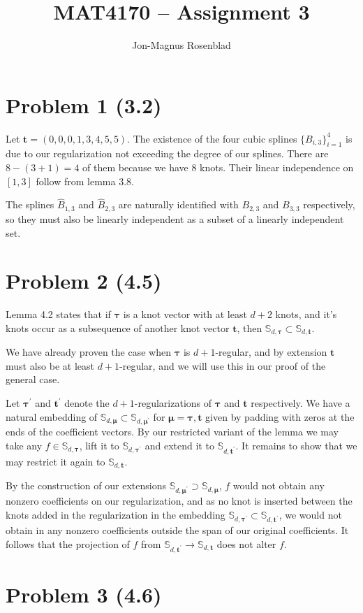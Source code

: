 \documentclass{article}
\title{MAT4170 -- Assignment 3}
\author{Jon-Magnus Rosenblad}
\date{}
\begin{document}
\maketitle

\section*{Problem 1 (3.2)}
Let $\mathbf t = (0,0,0,1,3,4,5,5)$.
The existence of the four cubic splines $\{B_{i,3}\}_{i=1}^4$ is due to our regularization not exceeding the degree of our splines.
There are $8 - (3 + 1) = 4$ of them because we have $8$ knots.
Their linear independence on $[1,3]$ follow from lemma 3.8.

The splines $\hat B_{1,3}$ and $\hat B_{2,3}$ are naturally identified with $B_{2,3}$ and $B_{3,3}$ respectively,
so they must also be linearly independent as a subset of a linearly independent set.

\section*{Problem 2 (4.5)}
Lemma 4.2 states that if $\mathbf \tau$ is a knot vector with at least $d + 2$ knots,
and it's knots occur as a subsequence of another knot vector $\mathbf t$,
then $\mathbb S_{d,\mathbf\tau}\subset \mathbb S_{d,\mathbf t}$.

We have already proven the case when $\mathbf \tau$ is $d + 1$-regular, and by extension $\mathbf t$ must also be at least $d + 1$-regular,
and we will use this in our proof of the general case.

Let $\mathbf \tau^\prime$ and $\mathbf t^\prime$ denote the $d + 1$-regularizations of $\mathbf \tau$ and $\mathbf t$ respectively.
We have a natural embedding of $\mathbb S_{d, \mathbf \mu}\subset \mathbb S_{d, \mathbf \mu^\prime}$ for $\mathbf \mu=\mathbf \tau, \mathbf t$
given by padding with zeros at the ends of the coefficient vectors.
By our restricted variant of the lemma we may take any $f\in\mathbb S_{d, \mathbf \tau}$,
lift it to $\mathbb S_{d, \mathbf \tau^\prime}$ and extend it to $\mathbb S_{d, \mathbf t^\prime}$.
It remains to show that we may restrict it again to $\mathbb S_{d, \mathbf t}$.

By the construction of our extensions $\mathbb S_{d,\mathbf\mu^\prime}\supset \mathbb S_{d, \mathbf \mu}$,
$f$ would not obtain any nonzero coefficients on our regularization,
and as no knot is inserted between the knots added in the regularization in the embedding $\mathbb S_{d,\mathbf \tau^\prime}\subset \mathbb S_{d,\mathbf t^\prime}$,
we would not obtain in any nonzero coefficients outside the span of our original coefficients.
It follows that the projection of $f$ from $\mathbb S_{d,\mathbf t^\prime}\to \mathbb S_{d,\mathbf t}$ does not alter $f$.

\section*{Problem 3 (4.6)}
\end{document}
